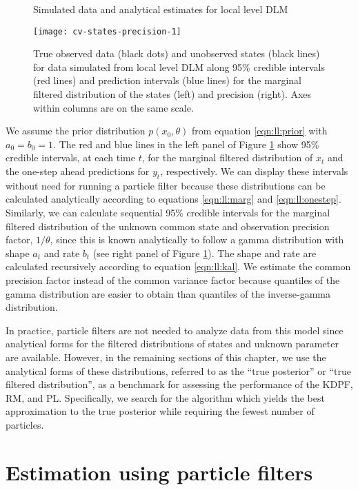 \begin{figure}[ht]
\ssp
\centering
\caption{Simulated data and analytical estimates for local level DLM} \label{fig:comp:data}
\texttt{[image: cv-states-precision-1]}
\caption*{True observed data (black dots) and unobserved states (black lines) for data simulated from local level DLM along 95\% credible intervals (red lines) and prediction intervals (blue lines) for the marginal filtered distribution of the states (left) and precision (right). Axes within columns are on the same scale.}
\end{figure}

We assume the prior distribution $p(x_0,\theta)$ from equation \eqref{eqn:ll:prior} with $a_0 = b_0 = 1$. The red and blue lines in the left panel of Figure \ref{fig:comp:data} show 95\% credible intervals, at each time $t$, for the marginal filtered distribution of $x_t$ and the one-step ahead predictions for $y_t$, respectively. We can display these intervals without need for running a particle filter because these distributions can be calculated analytically according to equations \eqref{eqn:ll:marg} and \eqref{eqn:ll:onestep}. Similarly, we can calculate sequential 95\% credible intervals for the marginal filtered distribution of the unknown common state and observation precision factor, $1/\theta$, since this is known analytically to follow a gamma distribution with shape $a_t$ and rate $b_t$  (see right panel of Figure \ref{fig:comp:data}). The shape and rate are calculated recursively according to equation \eqref{eqn:ll:kal}. We estimate the common precision factor instead of the common variance factor because quantiles of the gamma distribution are easier to obtain than quantiles of the inverse-gamma distribution.

In practice, particle filters are not needed to analyze data from this model since analytical forms for the filtered distributions of states and unknown parameter are available. However, in the remaining sections of this chapter, we use the analytical forms of these distributions, referred to as the ``true posterior'' or ``true filtered distribution'', as a benchmark for assessing the performance of the KDPF, RM, and PL. Specifically, we search for the algorithm which yields the best approximation to the true posterior while requiring the fewest number of particles.

\section{Estimation using particle filters} \label{sec:comp:est}

